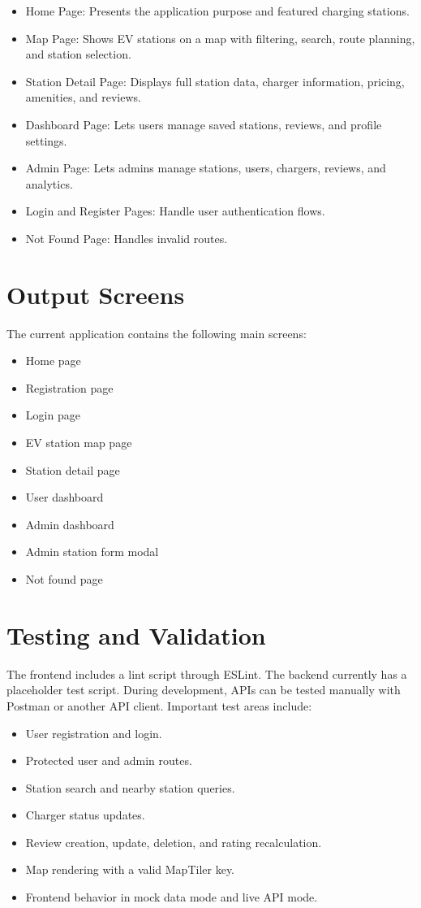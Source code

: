 \documentclass[12pt,a4paper]{article}
\begin{document}
\begin{itemize}
  \item Home Page: Presents the application purpose and featured charging stations.
  \item Map Page: Shows EV stations on a map with filtering, search, route planning, and station selection.
  \item Station Detail Page: Displays full station data, charger information, pricing, amenities, and reviews.
  \item Dashboard Page: Lets users manage saved stations, reviews, and profile settings.
  \item Admin Page: Lets admins manage stations, users, chargers, reviews, and analytics.
  \item Login and Register Pages: Handle user authentication flows.
  \item Not Found Page: Handles invalid routes.
\end{itemize}

\section{Output Screens}

The current application contains the following main screens:

\begin{itemize}
  \item Home page
  \item Registration page
  \item Login page
  \item EV station map page
  \item Station detail page
  \item User dashboard
  \item Admin dashboard
  \item Admin station form modal
  \item Not found page
\end{itemize}

\section{Testing and Validation}

The frontend includes a lint script through ESLint. The backend currently has a placeholder test script. During development, APIs can be tested manually with Postman or another API client. Important test areas include:

\begin{itemize}
  \item User registration and login.
  \item Protected user and admin routes.
  \item Station search and nearby station queries.
  \item Charger status updates.
  \item Review creation, update, deletion, and rating recalculation.
  \item Map rendering with a valid MapTiler key.
  \item Frontend behavior in mock data mode and live API mode.
\end{itemize}
\end{document}
